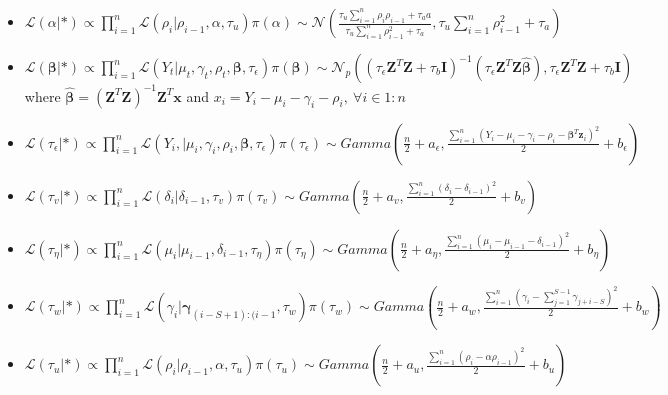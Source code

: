 \documentclass[11pt,twoside]{report}
\begin{document}
\begin{itemize}
	\item $\mathcal{L}(\alpha|*) \propto \prod_{i=1}^{n}\mathcal{L}(\rho_i|\rho_{i-1}, \alpha, \tau_u)\pi(\alpha)\sim\mathcal{N}(\frac{\tau_u\sum_{i=1}^n\rho_{i}\rho_{i-1} + \tau_a a}{\tau_u\sum_{i=1}^n\rho_{i-1}^2+\tau_a},\tau_u\sum_{i=1}^n\rho_{i-1}^2+\tau_a)$
	\item $\mathcal{L}(\boldsymbol{\beta}|*) \propto \prod_{i=1}^{n}\mathcal{L}(Y_t| \mu_t, \gamma_t, \rho_t, \boldsymbol{\beta},\tau_\epsilon)\pi(\boldsymbol{\beta})\sim\mathcal{N}_p({(\tau_\epsilon \mathbf{Z}^T\mathbf{Z} + \tau_b\mathbf{I})}^{-1} (\tau_\epsilon \mathbf{Z}^T\mathbf{Z} \hat{\boldsymbol{\beta}}),\tau_\epsilon \mathbf{Z}^T\mathbf{Z} + \tau_b\mathbf{I} )$ where $ \hat{\boldsymbol{\beta}}= (\mathbf{Z}^T\mathbf{Z})^{-1}\mathbf{Z}^T\mathbf{x} $ and $ x_i = Y_i-\mu_i-\gamma_i-\rho_i,\ \forall i \in 1:n $
	\item $\mathcal{L}(\tau_\epsilon|*) \propto \prod_{i=1}^{n}\mathcal{L}(Y_i,| \mu_i,\gamma_i, \rho_i, \boldsymbol{\beta}, \tau_\epsilon)\pi(\tau_\epsilon)\sim Gamma(\frac{n}{2}+ a_\epsilon, \frac{\sum_{i=1}^n(Y_i-\mu_i-\gamma_i-\rho_i-{\boldsymbol{\beta}}^T\mathbf{z}_i)^2}{2}+b_\epsilon)$
	\item $\mathcal{L}(\tau_v|*) \propto \prod_{i=1}^{n}\mathcal{L}(\delta_i|\delta_{i-1}, \tau_v)\pi(\tau_v)\sim Gamma(\frac{n}{2}+ a_v, \frac{\sum_{i=1}^n(\delta_i-\delta_{i-1})^2}{2}+b_v) $
	\item $\mathcal{L}(\tau_\eta|*) \propto \prod_{i=1}^{n}\mathcal{L}(\mu_i|\mu_{i-1}, \delta_{i-1}, \tau_\eta)\pi(\tau_\eta)\sim Gamma(\frac{n}{2}+ a_\eta, \frac{\sum_{i=1}^n(\mu_i-\mu_{i-1}-\delta_{i-1})^2}{2}+b_\eta) $
	\item $\mathcal{L}(\tau_w|*) \propto \prod_{i=1}^{n}\mathcal{L}(\gamma_{i}|\boldsymbol{\gamma}_{(i-S+1):(i-1}, \tau_w)\pi(\tau_w)\sim Gamma(\frac{n}{2}+ a_w, \frac{\sum_{i=1}^n(\gamma_i-\sum_{j=1}^{S-1}\gamma_{j+i-S})^2}{2}+b_w) $
	\item $\mathcal{L}(\tau_u|*) \propto \prod_{i=1}^{n}\mathcal{L}(\rho_i|\rho_{i-1}, \alpha, \tau_u)\pi(\tau_u)\sim Gamma(\frac{n}{2}+ a_u, \frac{\sum_{i=1}^n(\rho_i-\alpha\rho_{i-1})^2}{2}+b_u)$
\end{itemize}
\newpage
\end{document}
